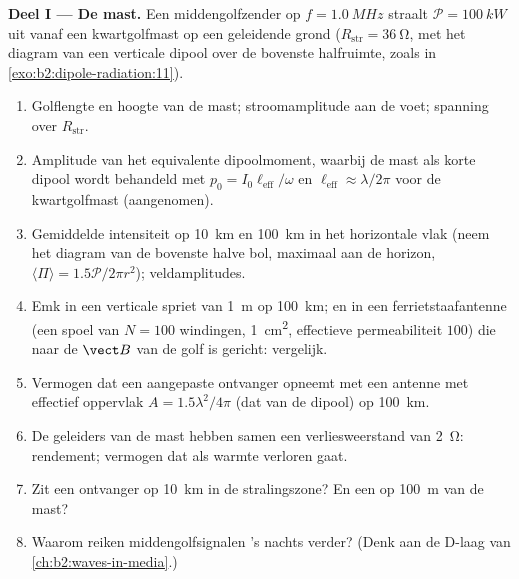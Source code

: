\begin{problem}
\label{pb:b2:dipole-radiation:1}

\medskip
\noindent\textbf{Deel I --- De mast.}
Een middengolfzender op $f = \qty{1.0}{MHz}$ straalt
$\mathcal P = \qty{100}{kW}$ uit vanaf een kwartgolfmast op een geleidende
grond ($R_{\text{str}} = \qty{36}{\ohm}$, met het diagram van een verticale
dipool over de bovenste halfruimte, zoals in
\cref{exo:b2:dipole-radiation:11}).
\begin{enumerate}
  \item Golflengte en hoogte van de mast; stroomamplitude aan de voet;
        spanning over $R_{\text{str}}$.
  \item Amplitude van het equivalente dipoolmoment, waarbij de mast als
        korte dipool wordt behandeld met $p_0 = I_0\ell_{\text{eff}}/\omega$
        en $\ell_{\text{eff}} \approx
        \lambda/2\pi$ voor de kwartgolfmast
        (aangenomen).
  \item Gemiddelde intensiteit op \qty{10}{km} en \qty{100}{km} in het
        horizontale vlak (neem het diagram van de bovenste halve bol,
        maximaal aan de horizon,
        $\langle\Pi\rangle = 1.5\mathcal P/2\pi r^2$); veldamplitudes.
  \item Emk in een verticale spriet van \qty{1}{m} op \qty{100}{km}; en in
        een ferrietstaafantenne (een spoel van $N = 100$ windingen,
        \qty{1}{cm^2}, effectieve permeabiliteit $100$) die naar de
        $\vect B$ van de golf is gericht: vergelijk.
  \item Vermogen dat een aangepaste ontvanger opneemt met een antenne met
        effectief oppervlak $A = 1.5\lambda^2/4\pi$ (dat van de dipool) op
        \qty{100}{km}.
  \item De geleiders van de mast hebben samen een verliesweerstand van
        \qty{2}{\ohm}: rendement; vermogen dat als warmte verloren gaat.
  \item Zit een ontvanger op \qty{10}{km} in de stralingszone? En een op
        \qty{100}{m} van de mast?
  \item Waarom reiken middengolfsignalen 's nachts verder? (Denk aan de
        D-laag van \cref{ch:b2:waves-in-media}.)
\end{enumerate}


\end{problem}
